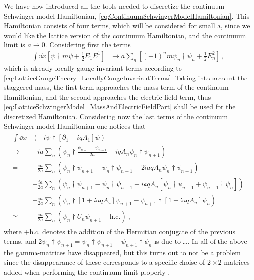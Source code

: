 \documentclass[../main.tex]{subfiles} %
\begin{document}
We have now introduced all the tools needed to discretize the continuum Schwinger model Hamiltonian, \cref{eq:ContinuumSchwingerModelHamiltonian}. This Hamiltonian consists of four terms, which will be considered for small $a$, since we would like the lattice version of the continuum Hamiltonian, and the continuum limit is $a \rightarrow 0$. Considering first the terms
\begin{align} \label{eq:LatticeSchwingerModel_MassAndElectricFieldPart}
    \int \dd{x} \left[ \psi\dagger m \psi + \frac{1}{2} E_1 E^1 \right]
    &\rightarrow a \sum_n \left[ (-1)^n m \psi_n\dagger \psi_n + \frac{1}{2} E_n^2 \right] \: ,
\end{align}
which is already locally gauge invariant terms according to \cref{eq:LatticeGaugeTheory_LocallyGaugeInvariantTerms}. Taking into account the staggered mass, the first term approaches the mass term of the continuum Hamiltonian, and the second approaches the electric field term, thus \cref{eq:LatticeSchwingerModel_MassAndElectricFieldPart} shall be used for the discretized Hamiltonian. Considering now the last terms of the continuum Schwinger model Hamiltonian one notices that
\begin{align} \label{eq:LatticeSchwingerModel_DifferentialPart}
\begin{split}
    \int \dd{x} &\left( -i\psi\dagger \left[ \partial_1 + iqA_1 \right] \psi \right) \\
    \rightarrow& -ia \sum_n \left( \psi_n\dagger \frac{\psi_{n+1} - \psi_{n-1}}{2a} + iqA_n \psi_n\dagger \psi_{n+1} \right) \\
    =& -\frac{ia}{2a} \sum_n \left( \psi_n\dagger \psi_{n+1} - \psi_n\dagger \psi_{n-1} + 2 iaqA_n \psi_n\dagger \psi_{n+1} \right) \\
    =& -\frac{ia}{2a} \sum_n \left( \psi_n\dagger \psi_{n+1} - \psi_n\dagger \psi_{n-1} + iaqA_n \left[ \psi_n\dagger \psi_{n+1} + \psi_{n+1}\dagger \psi_n \right] \right) \\
    =& -\frac{ia}{2a} \sum_n \left( \psi_n\dagger \left[ 1 + iaqA_n \right] \psi_{n+1} - \psi_{n+1}\dagger \left[ 1 - iaqA_n \right] \psi_n \right) \\
    \simeq& -\frac{ia}{2a} \sum_n \left( \psi_n\dagger U_n \psi_{n+1} - \mathrm{h.c.} \right) \: ,
\end{split}
\end{align}
where $+\mathrm{h.c.}$ denotes the addition of the Hermitian conjugate of the previous terms, and $2\psi_n\dagger \psi_{n+1} = \psi_n\dagger \psi_{n+1} + \psi_{n+1}\dagger \psi_n$ is due to \ldots . In all of the above the gamma-matrices have disappeared, but this turns out to not be a problem since the disappearance of these corresponds to a specific choise of $2 \times 2$ matrices added when performing the continuum limit properly \cite{panyella_masterThesis_2019}.
\end{document}
